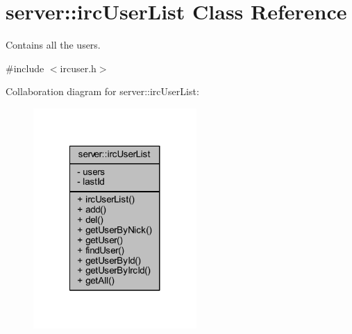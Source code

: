 \hypertarget{classserver_1_1irc_user_list}{\section{server\-:\-:irc\-User\-List Class Reference}
\label{d4/d08/classserver_1_1irc_user_list}
}


Contains all the users.  




{\ttfamily \#include $<$ircuser.\-h$>$}



Collaboration diagram for server\-:\-:irc\-User\-List\-:\nopagebreak
\begin{figure}[H]
\begin{center}
\leavevmode
\includegraphics[width=176pt]{d0/d1b/classserver_1_1irc_user_list__coll__graph}
\end{center}
\end{figure}
